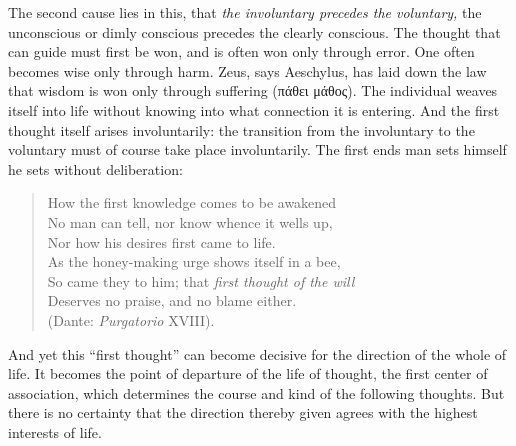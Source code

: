 \documentclass[12pt,a4paper,openany]{book}
\newcommand{\opage}[1]{\marginnote{\footnotesize\textit{[#1]}}}
\begin{document}
The second cause lies in this, that \textit{the involuntary precedes the voluntary,} the unconscious or
dimly conscious precedes the clearly conscious. The thought that can guide must first be won, and is
often won only through error. One often becomes wise only through harm. Zeus, says Aeschylus, has laid
down the law that wisdom is won only through suffering (πάθει μάθος). The individual weaves itself into
life without knowing into what connection it is entering. And the first thought itself arises
involuntarily: the transition from the involuntary to the voluntary must of course take place
involuntarily. The first ends man sets himself he sets without deliberation:

\begin{quote}
\opage{127}How the first knowledge comes to be awakened\\
No man can tell, nor know whence it wells up,\\
Nor how his desires first came to life.\\
As the honey-making urge shows itself in a bee,\\
So came they to him; that \textit{first thought of the will}\\
Deserves no praise, and no blame either.\\
(Dante: \textit{Purgatorio} XVIII).
\end{quote}

And yet this ``first thought'' can become decisive for the direction of the whole of life. It becomes the
point of departure of the life of thought, the first center of association, which determines the course
and kind of the following thoughts. But there is no certainty that the direction thereby given agrees with
the highest interests of life.
\end{document}

